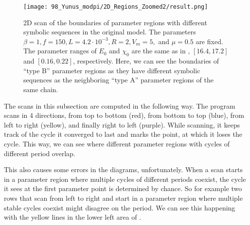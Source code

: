 \begin{figure}
	\centering
	\texttt{[image: 98\_Yunus\_modpi/2D\_Regions\_Zoomed2/result.png]}
	\caption[2D scan of the boundaries of parameter regions with different symbolic sequences in the original model]{
		2D scan of the boundaries of parameter regions with different symbolic sequences in the original model.
		The parameters $\beta = 1, f = 150, L = 4.2 \cdot 10^{-3}, R = 2, V_m = 5,$ and $\mu = 0.5$ are fixed.
		The parameter ranges of $E_0$ and $\chi_0$ are the same as in , $[16.4, 17.2]$ and $[0.16, 0.22]$, respectively.
		Here, we can see the boundaries of ``type B'' parameter regions as they have different symbolic sequences as the neighboring ``type A'' parameter regions of the same chain.
	}
	\label{fig:etup.og.overlapping.regions.zoomed}
\end{figure}

The scans in this subsection are computed in the following way.
The program scans in 4 directions, from top to bottom (red), from bottom to top (blue), from left to right (yellow), and finally right to left (purple).
While scanning, it keeps track of the cycle it converged to last and marks the point, at which it loses the cycle.
This way, we can see where different parameter regions with cycles of different period overlap.

This also causes some errors in the diagrams, unfortunately.
When a scan starts in a parameter region where multiple cycles of different periods coexist, the cycle it sees at the first parameter point is determined by chance.
So for example two rows that scan from left to right and start in a parameter region where multiple stable cycles coexist might disagree on the period.
We can see this happening with the yellow lines in the lower left area of .

